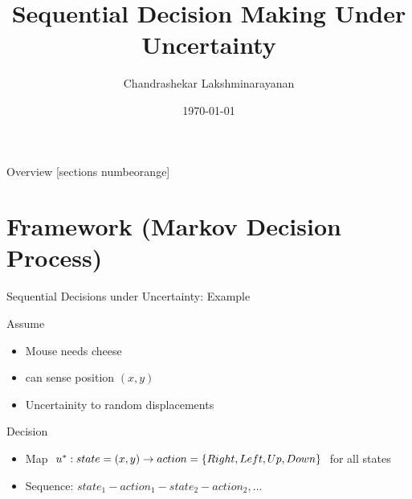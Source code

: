 \documentclass[10pt,handout]{beamer}
\title{Sequential Decision Making Under Uncertainty}
\date{\today}
\author{Chandrashekar Lakshminarayanan}
\institute{Reinforcement Learning \& Artificial Intelligence Group,\\University of Alberta}
\begin{document}
\maketitle

\begin{frame}{Overview}
  [sections numbeorange]
  \tableofcontents[hideallsubsections]
\end{frame}
\section{Framework (Markov Decision Process)}
\begin{frame}[fragile]{Sequential Decisions under Uncertainty: Example}
\color{black}
\begin{block}{Assume}
\begin{itemize}
\item Mouse needs cheese
\item can sense position $(x,y)$
\item Uncertainity to random displacements
\end{itemize}
\end{block}
\begin{block}{Decision}
\begin{itemize}
\item Map $u^*: state=(x,y)\rightarrow action=\{Right,Left,Up,Down\}$ for all states
\item Sequence: $state_1-action_1-state_2-action_2,\ldots$
\end{itemize}
\end{block}


\end{frame}
\end{document}
